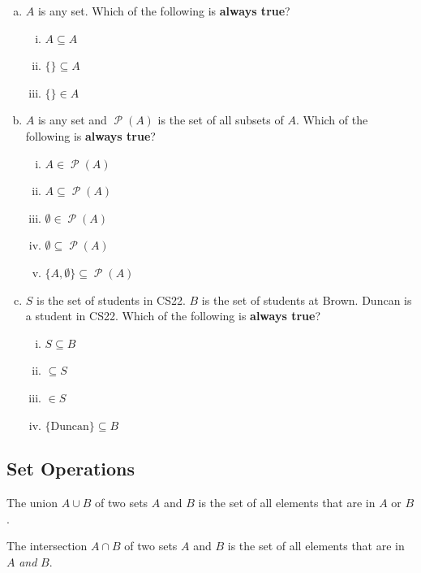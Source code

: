 \documentclass[12pt,letterpaper]{article}
\newcommand\Pow{\ensuremath{\operatorname{\mathcal{P}}}}
\begin{document}
    \begin{mdframed}
        \begin{enumerate}[a.]
        \item $A$ is any set. Which of the following is \textbf{always true}?
          \begin{enumerate}[i.]
            \item $A \subseteq A$
            \item $\{\} \subseteq A$
            \item $\{\} \in A$
		 \end{enumerate}
	  \item $A$ is any set and $\Pow{(A)}$ is the set of all subsets of $A$. Which of the following is \textbf{always true}?
		\begin{enumerate}[i.]
		   \item $A \in \Pow{(A)}$
		   \item $A \subseteq \Pow{(A)}$
		   \item $\emptyset \in \Pow{(A)}$
		   \item $\emptyset \subseteq \Pow{(A)}$
		   \item $\{A, \emptyset\} \subseteq \Pow{(A)}$
          \end{enumerate}
        \item $S$ is the set of students in CS22. $B$ is the set of students at Brown. Duncan is a student in CS22. Which of the following is \textbf{always true}?
        \begin{enumerate}[i.]
          \item $S \subseteq B$
          \item {} $\subseteq S$
          \item {} $\in S$
          \item $\{\text{Duncan}\} \subseteq B$
        \end{enumerate}
      \end{enumerate}
          
    \end{mdframed}

        
    \subsection{Set Operations}
    The union $A \cup B$ of two sets $A$ and $B$ is the set of all elements that are in $A$ or $B$.
    
    The intersection $A \cap B$ of two sets $A$ and $B$ is the set of all elements that are in $A$ \emph{and} $B$.
    
\end{document}
